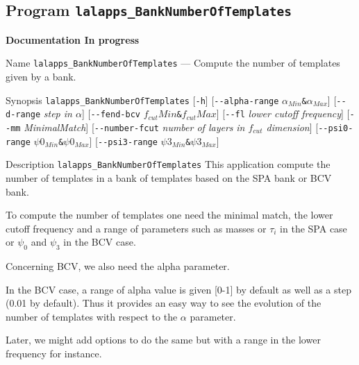 \subsection{Program \texttt{lalapps\_BankNumberOfTemplates}}
\label{program:lalapps-BankNumberOfTemplates}
{\LARGE{{\bf Documentation In progress}}}

\begin{entry}

\item[Name]
\verb$lalapps_BankNumberOfTemplates$ --- Compute the number of templates given 
by a bank.

\item[Synopsis]
\verb$lalapps_BankNumberOfTemplates$ [\verb$-h$] 
[\verb$--alpha-range$   \textit{$\alpha_{Min}$}\texttt{\&}\textit{$\alpha_{Max}$}]
[\verb$--d-range$   \textit{step in $\alpha$}]
[\verb$--fend-bcv$     \textit{$f_{cut}Min$}\texttt{\&}\textit{$f_{cut}Max$}]
[\verb$--fl$	\textit{lower cutoff frequency}]
[\verb$--mm$ \textit{MinimalMatch}]
[\verb$--number-fcut$ \textit{number of layers } \textit{ in $f_{cut}$ dimension}]
[\verb$--psi0-range$ \textit{$\psi0_{Min}$}\texttt{\&}\textit{$\psi0_{Max}$}]
[\verb$--psi3-range$ \textit{$\psi3_{Min}$}\texttt{\&}\textit{$\psi3_{Max}$}]







\item[Description]
\verb$lalapps_BankNumberOfTemplates$ This application compute the number of 
templates in  a bank of templates based on the SPA bank or BCV bank.

To compute the number of templates one need the minimal match, the lower cutoff
frequency and a range of parameters such as masses or $\tau_i$ in the SPA case or 
$\psi_0$ and $\psi_3$ in the  BCV case. 

Concerning BCV, we also need the alpha parameter. 

In the BCV case, a range of alpha value is given [0-1] by default as well as a step
 (0.01 by default). Thus it provides an easy way to see the evolution of the number of
templates with respect to the $\alpha$ parameter. 

Later, we might add options to do the same but with a range in the lower frequency for
instance.



\end{entry}
